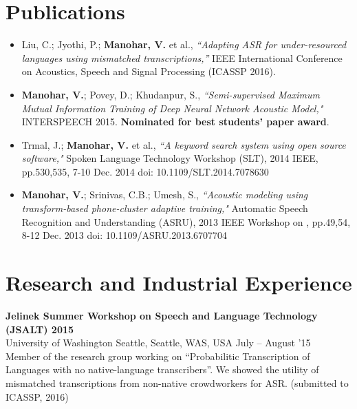 \documentclass[margin,line,pifont,palatino,courier]{res}
\begin{document}
\begin{resume}
\section{\sc Publications}
\begin{itemize}
  \item 
    Liu, C.; Jyothi, P.; \textbf{Manohar, V.} et al.,
    \textit{``Adapting ASR for under-resourced languages using mismatched
    transcriptions,''}
    IEEE International Conference on Acoustics, Speech and Signal Processing
    (ICASSP 2016). 
  \item 
    \textbf{Manohar, V.}; Povey, D.; Khudanpur, S., 
    \textit{``Semi-supervised Maximum Mutual Information Training of Deep Neural
    Network Acoustic Model,"}
    INTERSPEECH 2015. \textbf{Nominated for best students' paper award}.
  \item
    Trmal, J.; \textbf{Manohar, V.} et al., 
    \textit{``A keyword search system using open source software," } 
    Spoken Language Technology Workshop (SLT), 2014 IEEE, pp.530,535, 7-10 Dec. 2014
    doi: 10.1109/SLT.2014.7078630 
  \item
    \textbf{Manohar, V.}; Srinivas, C.B.; Umesh, S., 
    \textit{``Acoustic modeling
    using transform-based phone-cluster adaptive training,"} 
    Automatic Speech Recognition and Understanding (ASRU), 2013 IEEE Workshop on
    , pp.49,54, 8-12 Dec. 2013 doi: 10.1109/ASRU.2013.6707704
\end{itemize}
\section{\sc Research and Industrial Experience}

\textbf{Jelinek Summer Workshop on Speech and Language Technology (JSALT) 2015 } \\
University of Washington Seattle, Seattle, WAS, USA \hfill 
July -- August '15 \vspace{2pt} \\
Member of the research group working on ``Probabilitic Transcription of Languages with no native-language transcribers''. We showed the utility of mismatched transcriptions from non-native crowdworkers for ASR. (submitted to ICASSP, 2016)
\vspace{-5pt}


\end{resume}
\end{document}

